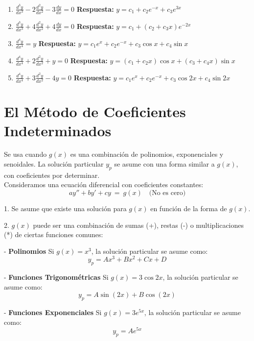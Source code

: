 \begin{enumerate}
    \item \( \frac{d^3 y}{dx^3} - 2 \frac{d^2 y}{dx^2} - 3 \frac{dy}{dx} = 0 \)  
    \textbf{Respuesta:} \( y = c_1 + c_2 e^{-x} + c_3 e^{3x} \)

    \item \( \frac{d^3 y}{dx^3} + 4 \frac{d^2 y}{dx^2} + 4 \frac{dy}{dx} = 0 \)  
    \textbf{Respuesta:} \( y = c_1 + (c_2 + c_3 x)e^{-2x} \)

    \item \( \frac{d^4 y}{dx^4} = y \)  
    \textbf{Respuesta:} \( y = c_1 e^x + c_2 e^{-x} + c_3 \cos x + c_4 \sin x \)

    \item \( \frac{d^4 y}{dx^4} + 2 \frac{d^2 y}{dx^2} + y = 0 \)  
    \textbf{Respuesta:} \( y = (c_1 + c_2 x) \cos x + (c_3 + c_4 x) \sin x \)

    \item \( \frac{d^4 y}{dx^4} + 3 \frac{d^2 y}{dx^2} - 4y = 0 \)  
    \textbf{Respuesta:} \( y = c_1 e^x + c_2 e^{-x} + c_3 \cos 2x + c_4 \sin 2x \)

\end{enumerate}

\section{El Método de Coeficientes Indeterminados}
Se usa cuando \( g(x) \) es una combinación de polinomios, exponenciales y senoidales. La solución particular \( y_p \) se asume con una forma similar a \( g(x) \), con coeficientes por determinar.\\
Consideramos una ecuación diferencial con coeficientes constantes:\[
ay''+by'+cy\ =\ g( x) \quad \text{(No es cero)}
\]

1. Se asume que existe una solución para \( g(x) \) en función de la forma de \( g(x) \).

2. \( g(x) \) puede ser una combinación de sumas (+), restas (-) o multiplicaciones (*) de ciertas funciones comunes:

   - \textbf{Polinomios}  
     Si \( g(x) = x^{3} \), la solución particular se asume como:
     \[
     y_{p} = Ax^{3} + Bx^{2} + Cx + D
     \]

   - \textbf{Funciones Trigonométricas}
     Si \( g(x) = 3\cos 2x \), la solución particular se asume como:
     \[
     y_{p} = A\sin(2x) + B\cos(2x)
     \]

   - \textbf{Funciones Exponenciales}  
     Si \( g(x) = 3e^{5x} \), la solución particular se asume como:
     \[
     y_{p} = Ae^{5x}
     \]

